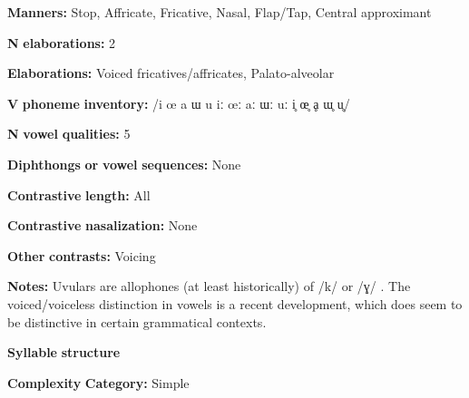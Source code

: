 \documentclass[output=paper]{langsci/langscibook}
\begin{document}
\begin{styleBody}
\textbf{Manners:} Stop, Affricate, Fricative, Nasal, Flap/Tap, Central approximant
\end{styleBody}

\begin{styleBody}
\textbf{N} \textbf{elaborations:} 2
\end{styleBody}

\begin{styleBody}
\textbf{Elaborations:} Voiced fricatives/affricates, Palato-alveolar
\end{styleBody}

\begin{styleBody}
\textbf{V} \textbf{phoneme} \textbf{inventory:} /i œ a ɯ u iː œː aː ɯː uː i̥ œ̥ ḁ ɯ̥ u̥/
\end{styleBody}

\begin{styleBody}
\textbf{N} \textbf{vowel} \textbf{qualities:} 5
\end{styleBody}

\begin{styleBody}
\textbf{Diphthongs} \textbf{or} \textbf{vowel} \textbf{sequences:} None
\end{styleBody}

\begin{styleBody}
\textbf{Contrastive} \textbf{length:} All
\end{styleBody}

\begin{styleBody}
\textbf{Contrastive} \textbf{nasalization:} None
\end{styleBody}

\begin{styleBody}
\textbf{Other} \textbf{contrasts:} Voicing
\end{styleBody}

\begin{styleBody}
\textbf{Notes:} Uvulars are allophones (at least historically) of /k/ or /ɣ/ \citep[26]{Givón2011}. The voiced/voiceless distinction in vowels is a recent development, which does seem to be distinctive in certain grammatical contexts.
\end{styleBody}

\begin{styleBody}
\textbf{Syllable} \textbf{structure}
\end{styleBody}

\begin{styleBody}
\textbf{Complexity} \textbf{Category:} Simple
\end{styleBody}
\end{document}

